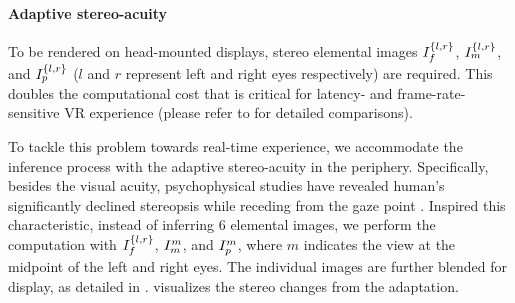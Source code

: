 \paragraph{Adaptive stereo-acuity}
{
To be rendered on head-mounted displays, stereo elemental images $I_{f}^{\{l,r\}}$, $I_{m}^{\{l,r\}}$, and $I_{p}^{\{l,r\}}$ ($l$ and $r$ represent left and right eyes respectively) are required. This doubles the computational cost that is critical for latency- and frame-rate- sensitive VR experience  
}
(please refer to  for detailed comparisons).

To tackle this problem towards real-time experience, we accommodate the inference process with the adaptive stereo-acuity in the periphery.
Specifically, besides the visual acuity, psychophysical studies have revealed human's significantly declined stereopsis while receding from the gaze point \cite{mochizuki2012magnitude}. Inspired this characteristic, instead of inferring $6$ elemental images, we perform the computation with $I_{f}^{\{l,r\}}$, $I_{m}^m$, and $I_{p}^m$, where $m$ indicates the view at the midpoint of the left and right eyes. The individual images are further blended for display, as detailed in . 
 visualizes the stereo changes from the adaptation.


